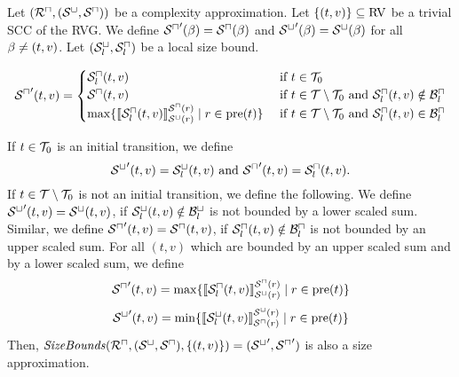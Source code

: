 \begin{theorem}
  Let $({\mathcal{R}^\sqcap}, {({\mathcal{S}^\sqcup}, {\mathcal{S}^\sqcap})})$ be a complexity approximation.
  Let $\lbrace (t,v) \rbrace \subseteq \text{RV}$ be a trivial SCC of the RVG.
  We define ${\mathcal{S}^\sqcap}'(\beta) = {\mathcal{S}^\sqcap}(\beta)$ and ${\mathcal{S}^\sqcup}'(\beta) = {\mathcal{S}^\sqcup}(\beta)$ for all $\beta \neq (t,v)$.
  Let ${({\mathcal{S}^\sqcup_l}, {\mathcal{S}^\sqcap_l})}$ be a local size bound.

  \[ {\mathcal{S}^\sqcap}'(t,v) =
  \begin{cases}
    {\mathcal{S}^\sqcap_l}(t, v) & \text{ if } t \in \mathcal{T}_0 \\
    {\mathcal{S}^\sqcap}(t, v) & \text{ if } t \in \mathcal{T} \setminus \mathcal{T}_0 \text{ and } {\mathcal{S}^\sqcap_l}(t,v) \notin \mathcal{B}^\sqcap_l \\
    \max \lbrace  \llbracket {\mathcal{S}^\sqcap_l}(t,v) \rrbracket_{{\mathcal{S}^\sqcup}(r)}^{{\mathcal{S}^\sqcap}(r)} \mid r \in \text{pre}(t) \rbrace & \text{ if } t \in \mathcal{T} \setminus \mathcal{T}_0 \text{ and } {\mathcal{S}^\sqcap_l}(t,v) \in \mathcal{B}^\sqcap_l \\
  \end{cases}
  \]

  If $t \in \mathcal{T}_0$ is an initial transition, we define
  \[ {\mathcal{S}^\sqcup}'(t, v) = {\mathcal{S}^\sqcup_l}(t, v) \text{ and } {\mathcal{S}^\sqcap}'(t, v) = {\mathcal{S}^\sqcap_l}(t, v). \]
  If $t \in \mathcal{T} \setminus \mathcal{T}_0$ is not an initial transition, we define the following.
  We define ${\mathcal{S}^\sqcup}'(t,v) = {\mathcal{S}^\sqcup}(t,v)$, if ${\mathcal{S}^\sqcup_l}(t,v) \notin \mathcal{B}^\sqcup_l$ is not bounded by a lower scaled sum.
  Similar, we define ${\mathcal{S}^\sqcap}'(t,v) = {\mathcal{S}^\sqcap}(t,v)$, if ${\mathcal{S}^\sqcap_l}(t,v) \notin \mathcal{B}^\sqcap_l$ is not bounded by an upper scaled sum.
  For all $(t,v)$ which are bounded by an upper scaled sum and by a lower scaled sum, we define 
  \[ {\mathcal{S}^\sqcap}'(t,v) = \max \lbrace  \llbracket {\mathcal{S}^\sqcap_l}(t,v) \rrbracket_{{\mathcal{S}^\sqcup}(r)}^{{\mathcal{S}^\sqcap}(r)} \mid r \in \text{pre}(t) \rbrace \]
  \[ {\mathcal{S}^\sqcup}'(t,v) = \min \lbrace  \llbracket {\mathcal{S}^\sqcup_l}(t,v) \rrbracket_{{\mathcal{S}^\sqcap}(r)}^{{\mathcal{S}^\sqcup}(r)} \mid r \in \text{pre}(t) \rbrace \]
  Then, $\mathit{SizeBounds}({\mathcal{R}^\sqcap}, {({\mathcal{S}^\sqcup}, {\mathcal{S}^\sqcap})}, \lbrace (t,v) \rbrace) = ({\mathcal{S}^\sqcup}', {\mathcal{S}^\sqcap}')$ is also a size approximation.
\end{theorem}
